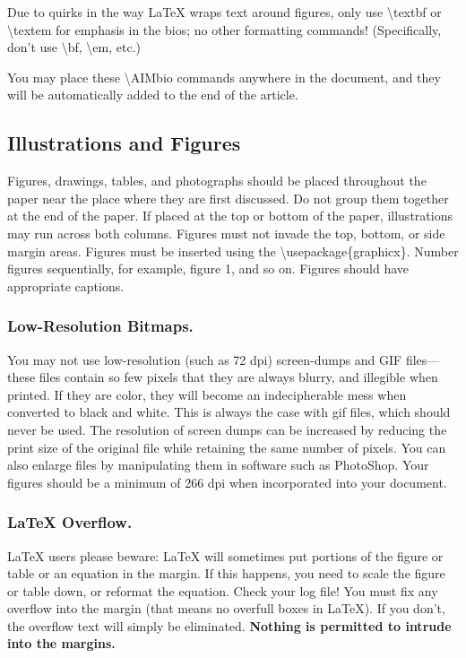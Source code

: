 \documentclass[letterpaper]{article}
\begin{document}
Due to quirks in the way LaTeX wraps text around figures, only use \textbackslash textbf or \textbackslash textem for emphasis in the bios; no other formatting commands!  (Specifically, don't use \textbackslash bf, \textbackslash em, etc.)

You may place these \textbackslash AIMbio commands anywhere in the document, and they will be automatically added to the end of the article.


\subsection{Illustrations and Figures}
Figures, drawings, tables, and photographs should be placed throughout the paper near the place where they are first discussed. Do not group them together at the end of the paper. If placed at the top or bottom of the paper, illustrations may run across both columns. Figures must not invade the top, bottom, or side margin areas. Figures must be inserted using the \textbackslash usepackage\{graphicx\}. Number figures sequentially, for example, figure 1, and so on. Figures should have appropriate captions.

\subsubsection{Low-Resolution Bitmaps.}
You may not use low-resolution (such as 72 dpi) screen-dumps and GIF files---these files contain so few pixels that they are always blurry, and illegible when printed. If they are color, they will become an indecipherable mess when converted to black and white. This is always the case with gif files, which should never be used. The resolution of screen dumps can be increased by reducing the print size of the original file while retaining the same number of pixels. You can also enlarge files by manipulating them in software such as PhotoShop. Your figures should be a minimum of 266 dpi when incorporated into your document.

\subsubsection{\LaTeX{} Overflow.}
\LaTeX{} users please beware: \LaTeX{} will sometimes put portions of the figure or table or an equation in the margin. If this happens, you need to scale the figure or table down, or reformat the equation. Check your log file! You must fix any overflow into the margin (that means no overfull boxes in \LaTeX{}). If you don't, the overflow text will simply be eliminated. \textbf{Nothing is permitted to intrude into the margins.}
\end{document}
